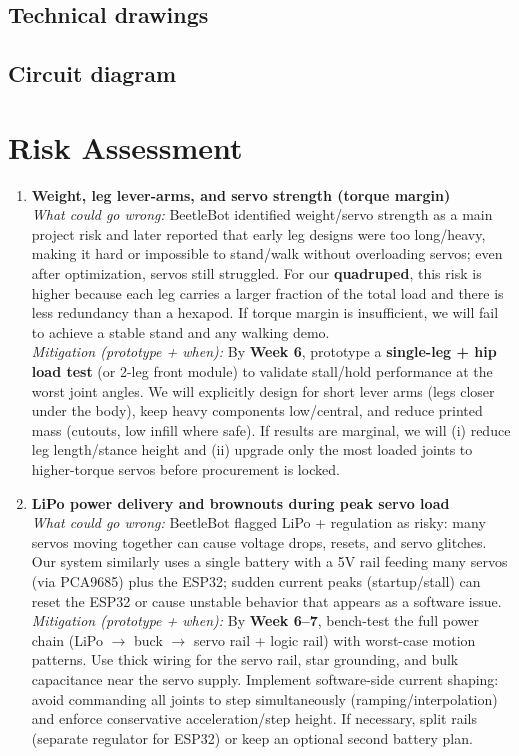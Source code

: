 \documentclass{article}
\begin{document}
\subsection{Technical drawings}
\subsection{Circuit diagram}

\section{Risk Assessment}

\begin{enumerate}
  \item \textbf{Weight, leg lever-arms, and servo strength (torque margin)} \\
        \textit{What could go wrong:} BeetleBot identified weight/servo strength as a main project risk and later reported that early leg designs were too long/heavy, making it hard or impossible to stand/walk without overloading servos; even after optimization, servos still struggled. For our \textbf{quadruped}, this risk is higher because each leg carries a larger fraction of the total load and there is less redundancy than a hexapod. If torque margin is insufficient, we will fail to achieve a stable stand and any walking demo. \\
        \textit{Mitigation (prototype + when):} By \textbf{Week 6}, prototype a \textbf{single-leg + hip load test} (or 2-leg front module) to validate stall/hold performance at the worst joint angles. We will explicitly design for short lever arms (legs closer under the body), keep heavy components low/central, and reduce printed mass (cutouts, low infill where safe). If results are marginal, we will (i) reduce leg length/stance height and (ii) upgrade only the most loaded joints to higher-torque servos before procurement is locked.

  \item \textbf{LiPo power delivery and brownouts during peak servo load} \\
        \textit{What could go wrong:} BeetleBot flagged LiPo + regulation as risky: many servos moving together can cause voltage drops, resets, and servo glitches. Our system similarly uses a single battery with a 5V rail feeding many servos (via PCA9685) plus the ESP32; sudden current peaks (startup/stall) can reset the ESP32 or cause unstable behavior that appears as a software issue. \\
        \textit{Mitigation (prototype + when):} By \textbf{Week 6--7}, bench-test the full power chain (LiPo $\rightarrow$ buck $\rightarrow$ servo rail + logic rail) with worst-case motion patterns. Use thick wiring for the servo rail, star grounding, and bulk capacitance near the servo supply. Implement software-side current shaping: avoid commanding all joints to step simultaneously (ramping/interpolation) and enforce conservative acceleration/step height. If necessary, split rails (separate regulator for ESP32) or keep an optional second battery plan.


\end{enumerate}
\end{document}
